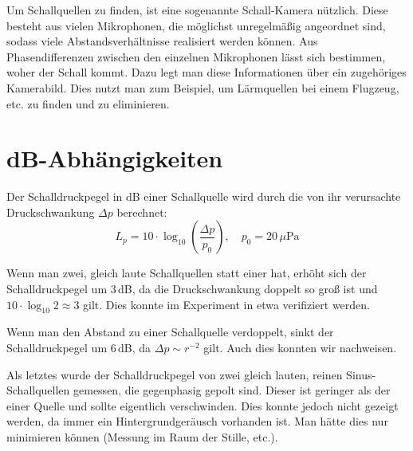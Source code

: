 \documentclass[12pt,a4paper,headinclude,bibtotoc]{scrartcl}
\begin{document}
Um Schallquellen zu finden, ist eine sogenannte Schall-Kamera nützlich.
Diese besteht aus vielen Mikrophonen, die möglichst unregelmäßig angeordnet sind, sodass viele Abstandsverhältnisse realisiert werden können.
Aus Phasendifferenzen zwischen den einzelnen Mikrophonen lässt sich bestimmen, woher der Schall kommt.
Dazu legt man diese Informationen über ein zugehöriges Kamerabild.
Dies nutzt man zum Beispiel, um Lärmquellen bei einem Flugzeug, etc. zu finden und zu eliminieren.

\section{dB-Abhängigkeiten}
Der Schalldruckpegel in dB einer Schallquelle wird durch die von ihr verursachte Druckschwankung $\Delta p$ berechnet:
$$ L_p=10\cdot \log_{10} \left(\frac{\Delta p}{p_0}\right),\quad p_0=20\,\mu \si{\pascal}$$


Wenn man zwei, gleich laute Schallquellen statt einer hat, erhöht sich der Schalldruckpegel um $3\,$dB, da die Druckschwankung doppelt so groß ist und $10\cdot\log_{10} 2 \approx 3$ gilt.
Dies konnte im Experiment in etwa verifiziert werden.

Wenn man den Abstand zu einer Schallquelle verdoppelt, sinkt der Schalldruckpegel um $6\,$dB, da $\Delta p \sim r^{-2}$ gilt.
Auch dies konnten wir nachweisen.

Als letztes wurde der Schalldruckpegel von zwei gleich lauten, reinen Sinus-Schallquellen gemessen, die gegenphasig gepolt sind.
Dieser ist geringer als der einer Quelle und sollte eigentlich verschwinden.
Dies konnte jedoch nicht gezeigt werden, da immer ein Hintergrundgeräusch vorhanden ist.
Man hätte dies nur minimieren können (Messung im Raum der Stille, etc.).
\end{document}

